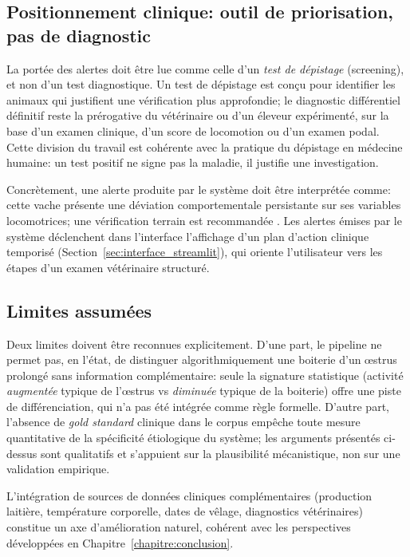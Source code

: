 \subsection{Positionnement clinique: outil de priorisation, pas de diagnostic}

La portée des alertes doit être lue comme celle d'un \textit{test de dépistage}
(screening), et non d'un test diagnostique. Un test de dépistage est conçu pour
identifier les animaux qui justifient une vérification plus approfondie; le diagnostic
différentiel définitif reste la prérogative du vétérinaire ou d'un éleveur expérimenté,
sur la base d'un examen clinique, d'un score de locomotion \citep{sprecher1997lameness}
ou d'un examen podal. Cette division du travail est cohérente avec la pratique du
dépistage en médecine humaine: un test positif ne signe pas la maladie, il justifie
une investigation.

Concrètement, une alerte produite par le système doit être interprétée comme:
\og cette vache présente une déviation comportementale persistante sur ses variables
locomotrices; une vérification terrain est recommandée \fg{}. Les alertes émises par
le système déclenchent dans l'interface l'affichage d'un plan d'action clinique
temporisé (Section~\ref{sec:interface_streamlit}), qui oriente l'utilisateur vers
les étapes d'un examen vétérinaire structuré.

\subsection{Limites assumées}

Deux limites doivent être reconnues explicitement. D'une part, le pipeline ne permet
pas, en l'état, de distinguer algorithmiquement une boiterie d'un œstrus prolongé
sans information complémentaire: seule la signature statistique (activité
\textit{augmentée} typique de l'œstrus vs \textit{diminuée} typique de la boiterie)
offre une piste de différenciation, qui n'a pas été intégrée comme règle formelle.
D'autre part, l'absence de \textit{gold standard} clinique dans le corpus empêche
toute mesure quantitative de la spécificité étiologique du système; les arguments
présentés ci-dessus sont qualitatifs et s'appuient sur la plausibilité
mécanistique, non sur une validation empirique.

L'intégration de sources de données cliniques complémentaires (production laitière,
température corporelle, dates de vêlage, diagnostics vétérinaires) constitue un axe
d'amélioration naturel, cohérent avec les perspectives développées en
Chapitre~\ref{chapitre:conclusion}.

